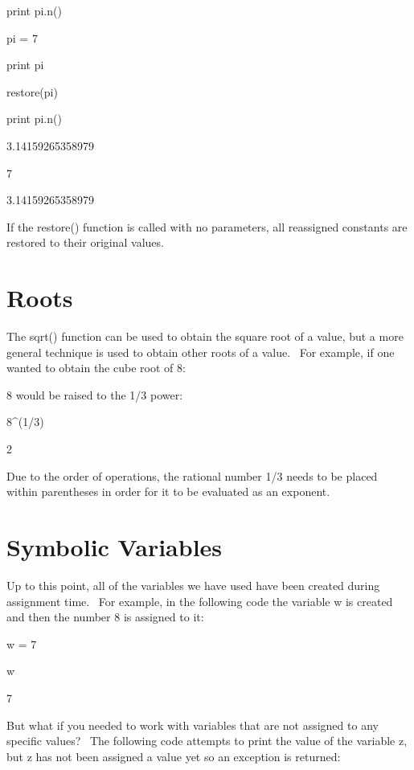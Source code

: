 \documentclass[12pt,twoside]{book}
\begin{document}
\bigskip

print pi.n()


\bigskip

pi = 7

print pi


\bigskip

restore({\textquotesingle}pi{\textquotesingle})

print pi.n()

{\textbar}

3.14159265358979

7

3.14159265358979

If the restore() function is called with no parameters, all reassigned
constants are restored to their original values.

\section[Roots]{Roots}

The sqrt() function can be used to obtain the square root of a value,
but a more general technique is used to obtain other roots of a value.
\ For example, if one wanted to obtain the cube root of 8:


\bigskip

8 would be raised to the 1/3 power:

8\^{}(1/3)

{\textbar}

2


\bigskip

Due to the order of operations, the rational number 1/3 needs to be
placed within parentheses in order for it to be evaluated as an
exponent.

\section[Symbolic Variables]{Symbolic Variables}
Up to this point, all of the variables we have used have been created
during assignment time. \ For example, in the following code the
variable w is created and then the number 8 is assigned to it:


\bigskip

w = 7

w

{\textbar}

7



But what if you needed to work with variables that are not assigned to
any specific values? \ The following code attempts to print the value
of the variable z, but z has not been assigned a value yet so an
exception is returned:
\end{document}
